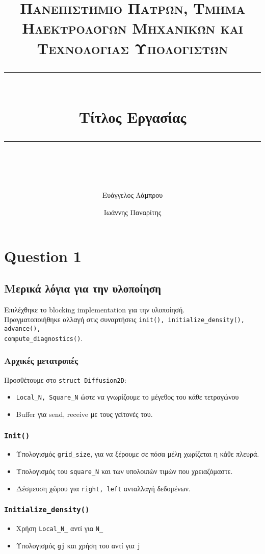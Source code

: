 \documentclass[11pt]{scrartcl} %
\title{	
	\normalfont\normalsize
	\textsc{Πανεπιστήμιο Πατρών, Τμήμα Ηλεκτρολόγων Μηχανικών και Τεχνολογίας Υπολογιστών}\\ %
	\vspace{25pt} %
	\rule{\linewidth}{0.5pt}\\ %
	\vspace{20pt} %
	{\huge Τίτλος Εργασίας}\\ %
	\vspace{12pt} %
	\rule{\linewidth}{2pt}\\ %
	\vspace{12pt} %
}
\author{Ευάγγελος Λάμπρου \and Ιωάννης Παναρίτης} %
\date{} %
\begin{document}
\maketitle 

\section*{Question 1}

    \subsection*{Μερικά λόγια για την υλοποίηση}
        Επιλέχθηκε το blocking implementation για την υλοποίησή.\\
        Πραγματοποιήθηκε αλλαγή στις συναρτήσεις \texttt{init(), initialize\_density(), advance(),\\compute\_diagnostics()}.
        
        \subsubsection*{Αρχικές μετατροπές}
            Προσθέτουμε στο \texttt{struct Diffusion2D}:
            \begin{itemize}
                \item \texttt{Local\_N, Square\_N} ώστε να γνωρίζουμε το μέγεθος του κάθε τετραγώνου
                \item Buffer για send, receive με τους γείτονές του.
            \end{itemize}
            
        \subsubsection*{\texttt{Init()}}
            \begin{itemize}
                 \item Υπολογισμός \texttt{grid\_size}, για να ξέρουμε σε πόσα μέλη χωρίζεται η κάθε πλευρά.
                \item Υπολογισμός του \texttt{square\_N} και των υπολοιπών τιμών που χρειαζόμαστε.
                \item Δέσμευση χώρου για \texttt{right, left} ανταλλαγή δεδομένων.
            \end{itemize}
        \subsubsection*{\texttt{Initialize\_density()}}
            \begin{itemize}
                \item Χρήση \texttt{Local\_N\_} αντί για \texttt{N\_}
                \item Υπολογισμός \texttt{gj} και χρήση του αντί για \texttt{j}
            \end{itemize}
\end{document}

